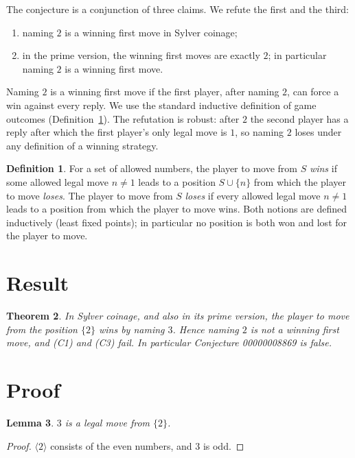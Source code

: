 \documentclass[11pt]{article}
\theoremstyle{plain}
\newtheorem{theorem}{Theorem}
\newtheorem{lemma}[theorem]{Lemma}
\theoremstyle{definition}
\newtheorem{definition}[theorem]{Definition}
\theoremstyle{remark}
\begin{document}
The conjecture is a conjunction of three claims. We refute the first and the third:
\begin{enumerate}
\item[(C1)] naming $2$ is a winning first move in Sylver coinage;
\item[(C3)] in the prime version, the winning first moves are exactly $2$; in
  particular naming $2$ is a winning first move.
\end{enumerate}
Naming $2$ is a winning first move if the first player, after naming $2$, can force a
win against every reply. We use the standard inductive definition of game outcomes
(Definition~\ref{def:outcome}). The refutation is robust: after $2$ the second player
has a reply after which the first player's only legal move is $1$, so naming $2$ loses
under any definition of a winning strategy.

\begin{definition}\label{def:outcome}
For a set of allowed numbers, the player to move from $S$ \emph{wins} if some allowed
legal move $n\ne1$ leads to a position $S\cup\{n\}$ from which the player to move
\emph{loses}. The player to move from $S$ \emph{loses} if every allowed legal move
$n\ne1$ leads to a position from which the player to move wins. Both notions are
defined inductively (least fixed points); in particular no position is both won and
lost for the player to move.
\end{definition}

\section{Result}

\begin{theorem}\label{thm:main}
In Sylver coinage, and also in its prime version, the player to move from the
position $\{2\}$ wins by naming $3$. Hence naming $2$ is not a winning first move, and
(C1) and (C3) fail. In particular Conjecture 00000008869 is false.
\end{theorem}

\section{Proof}

\begin{lemma}\label{lem:legal3}
$3$ is a legal move from $\{2\}$.
\end{lemma}

\begin{proof}
$\langle 2\rangle$ consists of the even numbers, and $3$ is odd.
\end{proof}
\end{document}
